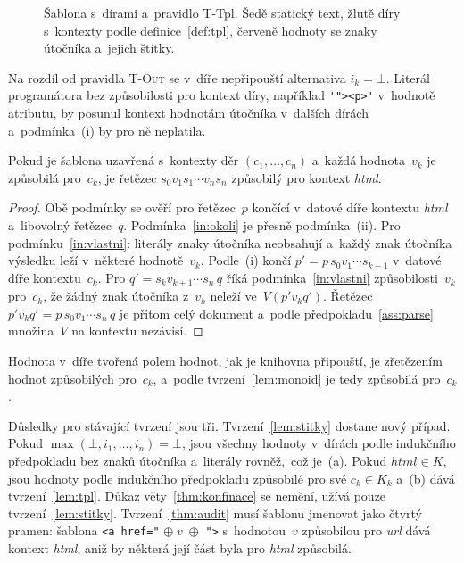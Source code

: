 \begin{figure}[htbp]
    \centering
    \caption[Šablona s~dírami a~pravidlo T-Tpl]{Šablona s~dírami a~pravidlo T-Tpl. Šedě statický text, žlutě díry s~kontexty podle definice~\ref{def:tpl}, červeně hodnoty se znaky útočníka a~jejich štítky.}
    \label{fig:sablona}
\end{figure}

Na rozdíl od pravidla \textsc{T-Out} se v~díře nepřipouští alternativa $i_k = \bot$. Literál programátora bez způsobilosti pro kontext díry, například \verb|'"><p>'| v~hodnotě atributu, by posunul kontext hodnotám útočníka v~dalších dírách a~podmínka~(i) by pro ně neplatila.

\begin{tvrzeni}
\label{lem:tpl}
Pokud je šablona uzavřená s~kontexty děr $(c_1, \ldots, c_n)$ a~každá hodnota~$v_k$ je způsobilá pro~$c_k$, je řetězec $s_0 v_1 s_1 \cdots v_n s_n$ způsobilý pro kontext \emph{html}.
\end{tvrzeni}

\begin{proof}
Obě podmínky se ověří pro řetězec~$p$ končící v~datové díře kontextu \emph{html} a~libovolný řetězec~$q$. Podmínka~\eqref{in:okoli} je přesně podmínka~(ii). Pro podmínku~\eqref{in:vlastni}: literály znaky útočníka neobsahují a~každý znak útočníka výsledku leží v~některé hodnotě~$v_k$. Podle~(i) končí $p' = p\,s_0 v_1 \cdots s_{k-1}$ v~datové díře kontextu~$c_k$. Pro $q' = s_k v_{k+1} \cdots s_n\,q$ říká podmínka~\eqref{in:vlastni} způsobilosti~$v_k$ pro~$c_k$, že žádný znak útočníka z~$v_k$ neleží ve~$V(p' v_k q')$. Řetězec $p' v_k q' = p\,s_0 v_1 \cdots s_n\,q$ je přitom celý dokument a~podle předpokladu~\ref{ass:parse} množina~$V$ na kontextu nezávisí.
\end{proof}

Hodnota v~díře tvořená polem hodnot, jak je knihovna připouští, je zřetězením hodnot způsobilých pro~$c_k$, a~podle tvrzení~\ref{lem:monoid} je tedy způsobilá pro~$c_k$.

Důsledky pro stávající tvrzení jsou tři. Tvrzení~\ref{lem:stitky} dostane nový případ. Pokud $\max(\bot, i_1, \ldots, i_n) = \bot$, jsou všechny hodnoty v~dírách podle indukčního předpokladu bez znaků útočníka a~literály rovněž,~což je~(a). Pokud $\mathit{html} \in K$, jsou hodnoty podle indukčního předpokladu způsobilé pro své $c_k \in K_k$ a~(b) dává tvrzení~\ref{lem:tpl}. Důkaz věty~\ref{thm:konfinace} se nemění, užívá pouze tvrzení~\ref{lem:stitky}. Tvrzení~\ref{thm:audit} musí šablonu jmenovat jako čtvrtý pramen: šablona \verb|<a href="| $\oplus\; v \;\oplus$ \verb|">| s~hodnotou~$v$ způsobilou pro \emph{url} dává kontext \emph{html}, aniž by některá její část byla pro \emph{html} způsobilá.

